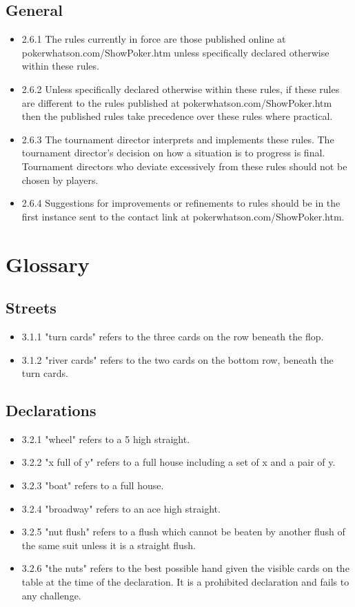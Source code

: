 \documentclass[a4paper,12pt]{article}
\begin{document}
\subsection{General}
\begin{itemize}
\item 2.6.1 The rules currently in force are those published online at pokerwhatson.com/ShowPoker.htm unless specifically declared otherwise within these rules.
\item 2.6.2 Unless specifically declared otherwise within these rules, if these rules are different to the rules published at pokerwhatson.com/ShowPoker.htm then the published rules take precedence over these rules where practical.
\item 2.6.3 The tournament director interprets and implements these rules. The tournament director's decision on how a situation is to progress is final. Tournament directors who deviate excessively from these rules should not be chosen by players.
\item 2.6.4 Suggestions for improvements or refinements to rules should be in the first instance sent to the contact link at pokerwhatson.com/ShowPoker.htm.


\end{itemize}

\section{Glossary}
\subsection{Streets}
\begin{itemize}
\item 3.1.1 "turn cards" refers to the three cards on the row beneath the flop.
\item 3.1.2 "river cards" refers to the two cards on the bottom row, beneath the turn cards.
\end{itemize}
\subsection{Declarations}
\begin{itemize}
\item 3.2.1 "wheel" refers to a 5 high straight.
\item 3.2.2 "x full of y" refers to a full house including a set of x and a pair of y.
\item 3.2.3 "boat" refers to a full house.
\item 3.2.4 "broadway" refers to an ace high straight.
\item 3.2.5 "nut flush" refers to a flush which cannot be beaten by another flush of the same suit unless it is a straight flush.
\item 3.2.6 "the nuts" refers to the best possible hand given the visible cards on the table at the time of the declaration. It is a prohibited declaration and fails to any challenge.
\end{itemize}
\end{document}
